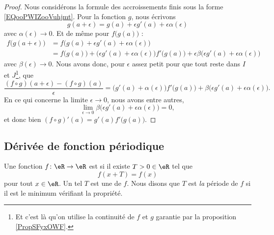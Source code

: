\begin{proof}
	Nous considérons la formule des accroissements finis sous la forme \eqref{EQooPWIZooVuhjmt}. Pour la fonction \( g\), nous écrivons
	\begin{equation}
		g(a+\epsilon)=g(a)+\epsilon g'(a)+\epsilon\alpha(\epsilon)
	\end{equation}
	avec \( \alpha(\epsilon)\to 0\). Et de même pour \( f\big( g(a) \big)\) :
	\begin{subequations}
		\begin{align}
			f\big( g(a+\epsilon) \big) & =f\big( g(a)+\epsilon g'(a)+\epsilon\alpha(\epsilon) \big)                                                                                                \\
			                           & =f\big( g(a) \big)+\big( \epsilon g'(a)+\epsilon\alpha(\epsilon) \big)f'\big( g(a) \big)+\epsilon\beta\big( \epsilon g'(a)+\epsilon\alpha(\epsilon) \big)
		\end{align}
	\end{subequations}
	avec \( \beta(\epsilon)\to 0\). Nous avons donc, pour \( \epsilon\) assez petit pour que tout reste dans \( I\) et \( J\)\footnote{Et c'est là qu'on utilise la continuité de \( f\) et \( g\) garantie par la proposition \ref{PropSFyxOWF}.}, que
	\begin{equation}
		\frac{ (f\circ g)(a+\epsilon)-(f\circ g)(a) }{ \epsilon }=\big( g'(a)+\alpha(\epsilon) \big)f'\big( g(a) \big)+\beta\big( \epsilon g'(a)+\epsilon\alpha(\epsilon) \big).
	\end{equation}
	En ce qui concerne la limite \( \epsilon\to 0\), nous avons entre autres,
	\begin{equation}
		\lim_{\epsilon\to 0}\beta\big( \epsilon g'(a)+\epsilon\alpha(\epsilon) \big)=0,
	\end{equation}
	et donc bien \( (f\circ g)'(a)=g'( a )f'\big( g(a) \big)\).
\end{proof}

\subsection{Dérivée de fonction périodique}

\begin{definition}      \label{DEFooHUZAooYyBmwe}
	Une fonction \( f\colon \eR\to \eR\) est  si il existe \( T>0\in \eR\) tel que
	\begin{equation}
		f(x+T)=f(x)
	\end{equation}
	pour tout \( x\in \eR\). Un tel \( T\) est une  de \( f\). Nous disons que \( T\) est \emph{la} période de \( f\) si il est le minimum vérifiant la propriété.
\end{definition}

